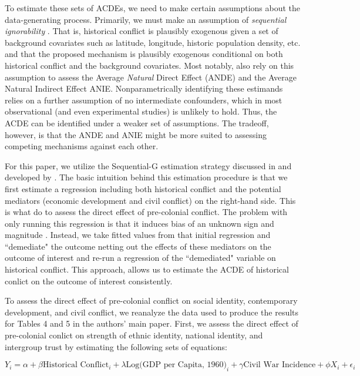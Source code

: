 To estimate these sets of ACDEs, we need to make certain assumptions about the data-generating process. Primarily, we must make an assumption of \emph{sequential ignorability} \citet{Robins1997,AcharyaBlackwellSen2016}. That is, historical conflict is plausibly exogenous given a set of background covariates such as latitude, longitude, historic population density, etc. and that the proposed mechanism is plausibly exogenous conditional on both historical conflict and the background covariates. Most notably, \citet{ImaiEtAl2011} also rely on this assumption to assess the Average \emph{Natural} Direct Effect (ANDE) and the Average Natural Indirect Effect {ANIE}. Nonparametrically identifying these estimands relies on a further assumption of no intermediate confounders, which in most observational (and even experimental studies) is unlikely to hold. Thus, the ACDE can be identified under a weaker set of assumptions. The tradeoff, however, is that the ANDE and ANIE might be more suited to assessing competing mechanisms against each other. 

For this paper, we utilize the Sequential-G estimation strategy discussed in \citet{AcharyaBlackwellSen2016} and developed by \citet{JoffeGreene2009,Vansteelandt2009}. The basic intuition behind this estimation procedure is that we first estimate a regression including both historical conflict and the potential mediators (economic development and civil conflict) on the right-hand side. This is what \citet{BesleyRQ2014} do to assess the direct effect of pre-colonial conflict. The problem with only running this regression is that it induces bias of an unknown sign and magnitude \citep{AcharyaBlackwellSen2016}. Instead, we take fitted values from that initial regression and ``demediate" the outcome netting out the effects of these mediators on the outcome of interest and re-run a regression of the ``demediated" variable on historical conflict. This approach, allows us to estimate the ACDE of historical conlict on the outcome of interest consistently. 

To assess the direct effect of pre-colonial conflict on social identity, contemporary development, and civil conflict, we reanalyze the data used to produce the results for Tables 4 and 5 in the authors' main paper. First, we assess the direct effect of pre-colonial conlict on strength of ethnic identity, national identity, and intergroup trust by estimating the following sets of equations:

\begin{equation}
Y_i = \alpha + \beta \text{Historical Conflict}_i + \lambda \text{Log(GDP per Capita, 1960)}_i + \gamma \text{Civil War Incidence} + \phi X_i + \epsilon_i
\end{equation}

